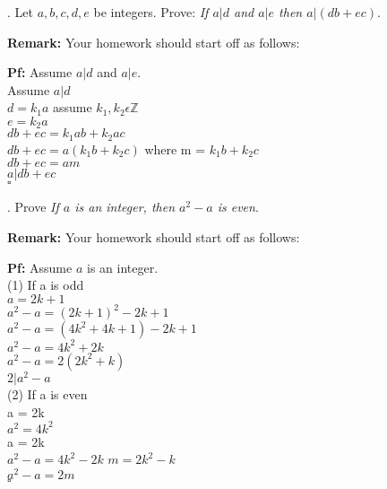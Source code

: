 \documentclass[12pt]{article}
\begin{document}
.  Let $a, b, c, d, e$ be integers.  Prove: \textit{If $a | d$ and $a | e$ then $a |( db + ec)$}.
\vspace{.05in}


\noindent \textbf{Remark:} Your homework should start off as follows:
\vspace{.05in}

\noindent \textbf{Pf:}  Assume $a|d$ and $a |e$.\\
\indent Assume $a | d$ \\ 
\indent $d = k_1a$
\indent \hspace{1cm} assume $k_1, k_2 \epsilon \mathbb{Z}$ \\
\indent$e = k_2a$ \\ 
\indent$db + ec = k_1ab + k_2ac$ \\ 
\indent$db + ec = a (k_1b + k_2c)$ \hspace{1cm} where m = $k_1b + k_2c$ \\ 
\indent$db + ec = am$ \\
\indent$a|db + ec$ \\
$\square$

\vspace{.15in}

.  Prove \textit{ If $a$ is an integer, then $a^{2} - a$ is even}.
\vspace{.05in}

\noindent \textbf{Remark:} Your homework should start off as follows:
\vspace{.05in}

\noindent \textbf{Pf:}  Assume $a$ is an integer. \\
\indent (1) If a is odd  \\
\indent $a = 2k + 1$\\
\indent $a^2 - a = (2k+1)^2 - 2k+1$\\
\indent $a^2 - a = (4k^2 + 4k + 1) - 2k + 1$\\
\indent $a^2 - a = 4k^2 + 2k$\\
\indent $a^2 - a = 2(2k^2 + k)$\\
\indent $2|a^2 - a$\\

\indent (2) If a is even \\ 
\indent a = 2k \\
\indent $a^2 = 4k^2$ \\ 
\indent a = 2k \\
\indent $a^2 - a = 4k^2 -2k$ \hspace{1cm} $m = 2k^2 -k$\\
\indent $a^2 - a = 2m$ \\
$\square$
\vspace{.15in}
\end{document}

